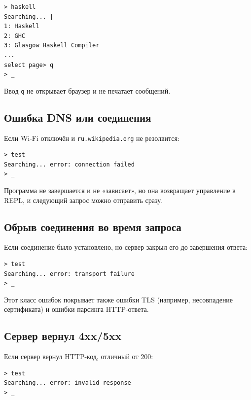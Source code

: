 \documentclass[12pt]{extarticle}
\renewcommand{\baselinestretch}{1.5}
\begin{document}
\renewcommand{\baselinestretch}{1}
\begin{lstlisting}
> haskell
Searching... |
1: Haskell
2: GHC
3: Glasgow Haskell Compiler
...
select page> q
> _
\end{lstlisting}
\renewcommand{\baselinestretch}{1.5}

Ввод \texttt{q} не открывает браузер и не печатает сообщений.

\subsection{Ошибка DNS или соединения}

Если Wi-Fi отключён и \texttt{ru.wikipedia.org} не резолвится:

\renewcommand{\baselinestretch}{1}
\begin{lstlisting}
> test
Searching... error: connection failed
> _
\end{lstlisting}
\renewcommand{\baselinestretch}{1.5}

Программа не завершается и не «зависает», но она возвращает
управление в REPL, и следующий запрос можно отправить сразу.

\subsection{Обрыв соединения во время запроса}

Если соединение было установлено, но сервер закрыл его до
завершения ответа:

\renewcommand{\baselinestretch}{1}
\begin{lstlisting}
> test
Searching... error: transport failure
> _
\end{lstlisting}
\renewcommand{\baselinestretch}{1.5}

Этот класс ошибок покрывает также ошибки TLS (например,
несовпадение сертификата) и ошибки парсинга HTTP-ответа.

\subsection{Сервер вернул 4xx/5xx}

Если сервер вернул HTTP-код, отличный от 200:

\renewcommand{\baselinestretch}{1}
\begin{lstlisting}
> test
Searching... error: invalid response
> _
\end{lstlisting}
\renewcommand{\baselinestretch}{1.5}
\end{document}
